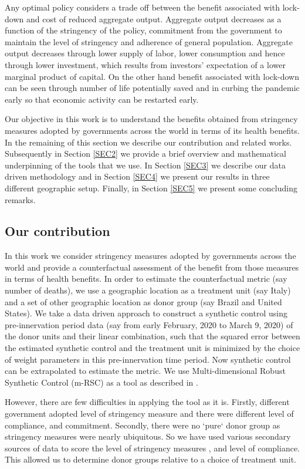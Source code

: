 \documentclass[preprint,authoryear,12pt]{elsarticle}
\begin{document}
	Any optimal policy considers a trade off between the benefit associated with lock-down and cost of reduced aggregate output. Aggregate output decreases as a function of the stringency of the policy, commitment from the government to maintain the level of stringency and adherence of general population. Aggregate output decreases through lower supply of labor, lower consumption and hence through lower investment, which results from investors’ expectation of a lower marginal product of capital. On the other hand benefit associated with lock-down can be seen through number of life potentially saved and in curbing the pandemic early so that economic activity can be restarted early. 
	
	Our objective in this work is to understand the benefits obtained from stringency measures adopted by governments across the world in terms of its health benefits. In the remaining of this section we describe our contribution and related  works. Subsequently in Section \ref{SEC2} we provide a brief overview and mathematical underpinning of the tools that we use. In Section \ref{SEC3} we describe our data driven methodology and in Section \ref{SEC4} we present our results in three different geographic setup. Finally, in Section \ref{SEC5} we present some concluding remarks.
	
	\subsection{Our contribution}
	In this work we consider stringency measures adopted by governments across the world and provide a counterfactual assessment of the benefit from those measures in terms of health benefits. In order to estimate the counterfactual metric (say number of deaths), we use a geographic location as a treatment unit (say Italy) and a set of other geographic location as donor group (say Brazil and United States). We take a data driven approach to construct a synthetic control \cite{ap08746, JMLR18, AMSS19} using pre-innervation period data (say from early February, 2020 to March 9, 2020) of the donor units and their linear combination, such that the squared error between the estimated synthetic control  and the treatment unit is minimized by the choice of weight parameters in this pre-innervation time period. Now synthetic control can be extrapolated to estimate the metric. We use Multi-dimensional Robust Synthetic Control (m-RSC) as a tool as described in \cite{AMSS19}. 
	
	However, there are few difficulties  in applying the tool as it is.  Firstly, different government adopted level of stringency measure and there were different level of compliance, and commitment. Secondly, there were no `pure` donor group as stringency measures were nearly ubiquitous. So we have used various secondary sources of data to score the level of stringency measures , and level of compliance. This allowed us to determine donor groups relative to a choice of treatment unit.
	
\end{document}
